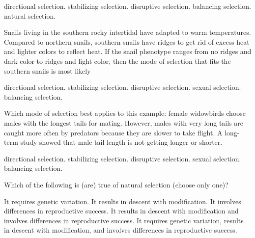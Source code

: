 \begin{choices}
\choice directional selection. %
\correctchoice stabilizing selection. %
\choice disruptive selection. %
\choice balancing selection. %
\choice natural selection. %
\end{choices}

\question
Snails living in the southern rocky intertidal have adapted to warm temperatures. Compared to northern snails, southern snails have ridges to get rid of excess heat and lighter colors to reflect heat. If the snail phenotype ranges from no ridges and dark color to ridges and light color, then the mode of selection that fits the southern snails is most likely

\begin{choices}
	\correctchoice directional selection. %
	\choice stabilizing selection. %
	\choice disruptive selection. %
	\choice sexual selection. %
	\choice balancing selection. %
\end{choices}


\question
Which mode of selection best applies to this example: female widowbirds choose males with the longest tails for mating. However, males with very long tails are caught more often by predators because they are slower to take flight. A long-term study showed that male tail length is not getting longer or shorter. 

\begin{choices}
	\choice directional selection. %
	\correctchoice stabilizing selection. %
	\choice disruptive selection. %
	\choice sexual selection. %
	\choice balancing selection. %
\end{choices}



\question
Which of the following is (are) true of natural selection (choose only one)?

\begin{choices}
\choice It requires genetic variation. %
\choice It results in descent with modification. %
\choice It involves differences in reproductive success. %
\choice It results in descent with modification and involves differences in reproductive success. %
\correctchoice It requires genetic variation, results in descent with modification, and involves differences in reproductive success. %
\end{choices}

